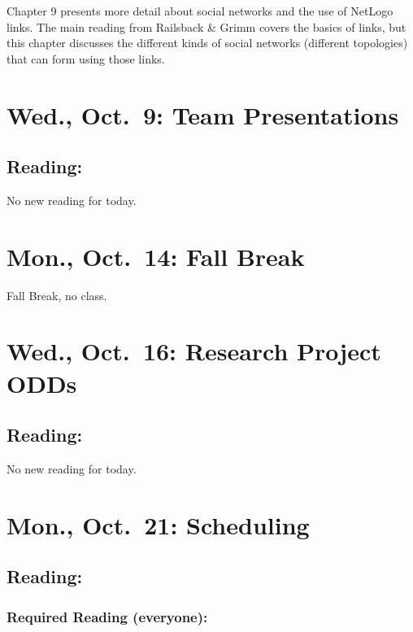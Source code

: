 \documentclass[
]{article}
\begin{document}
Chapter 9 presents more detail about social networks and the use of
NetLogo links. The main reading from Railsback \& Grimm covers the
basics of links, but this chapter discusses the different kinds of
social networks (different topologies) that can form using those links.

\section{Wed., Oct.~9: Team
Presentations}\label{wed.-oct.-9-team-presentations}

\subsection{Reading:}\label{reading-14}

No new reading for today.

\section{Mon., Oct.~14: Fall Break}\label{mon.-oct.-14-fall-break}

Fall Break, no class.

\section{Wed., Oct.~16: Research Project
ODDs}\label{wed.-oct.-16-research-project-odds}

\subsection{Reading:}\label{reading-15}

No new reading for today.

\section{Mon., Oct.~21: Scheduling}\label{mon.-oct.-21-scheduling}

\subsection{Reading:}\label{reading-16}

\subsubsection{Required Reading
(everyone):}\label{required-reading-everyone-13}
\end{document}
